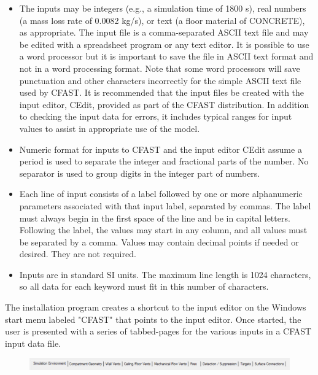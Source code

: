 \begin{itemize}
\item The inputs may be integers (e.g., a simulation time of 1800 s), real numbers (a mass loss rate of 0.0082 kg/s), or text (a floor material of CONCRETE), as appropriate. The input file is a comma-separated ASCII text file and may be edited with a spreadsheet program or any text editor. It is possible to use a word processor but it is important to save the file in ASCII text format and not in a word processing format. Note that some word processors will save punctuation and other characters incorrectly for the simple ASCII text file used by CFAST. It is recommended that the input files be created with the input editor, CEdit, provided as part of the CFAST distribution.  In addition to checking the input data for errors, it includes typical ranges for input values to assist in appropriate use of the model.

\item Numeric format for inputs to CFAST and the input editor CEdit assume a period is used to separate the integer and fractional parts of the number. No separator is used to group digits in the integer part of numbers.

\item Each line of input consists of a label followed by one or more alphanumeric parameters associated with that input label, separated by commas.  The label must always begin in the first space of the line and be in capital letters.  Following the label, the values may start in any column, and all values must be separated by a comma.  Values may contain decimal points if needed or desired.  They are not required.

\item Inputs are in standard SI units.  The maximum line length is 1024 characters, so all data for each keyword must fit in this number of characters.
\end{itemize}

The installation program creates a shortcut to the input editor on the Windows start menu labeled "CFAST" that points to the input editor.  Once started, the user is presented with a series of tabbed-pages for the various inputs in a CFAST input data file.

\begin{figure}[h!]
\begin{center}
\includegraphics[width=6.5in]{FIGURES/Input_File/Tabs}
\end{center}
\end{figure}

